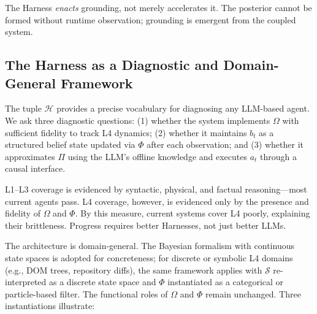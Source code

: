 The Harness \emph{enacts} grounding, not merely accelerates it. The posterior cannot be formed without runtime observation; grounding is emergent from the coupled system.

\subsection{The Harness as a Diagnostic and Domain-General Framework}

The tuple \(\mathcal{H}\) provides a precise vocabulary for diagnosing any LLM-based agent. We ask three diagnostic questions: (1) whether the system implements \(\Omega\) with sufficient fidelity to track L4 dynamics; (2) whether it maintains \(b_t\) as a structured belief state updated via \(\Phi\) after each observation; and (3) whether it approximates \(\Pi\) using the LLM's offline knowledge and executes \(a_t\) through a causal interface.

L1--L3 coverage is evidenced by syntactic, physical, and factual reasoning---most current agents pass. L4 coverage, however, is evidenced only by the presence and fidelity of \(\Omega\) and \(\Phi\). By this measure, current systems cover L4 poorly, explaining their brittleness. Progress requires better Harnesses, not just better LLMs.

The architecture is domain-general. The Bayesian formalism with continuous state spaces is adopted for concreteness; for discrete or symbolic L4 domains (e.g., DOM trees, repository diffs), the same framework applies with \(\mathcal{S}\) re-interpreted as a discrete state space and \(\Phi\) instantiated as a categorical or particle-based filter. The functional roles of \(\Omega\) and \(\Phi\) remain unchanged. Three instantiations illustrate:

